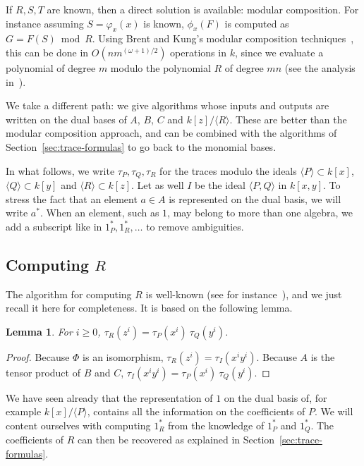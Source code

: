 \documentclass[12pt]{article}
\newcommand{\ang}[1]{\langle#1\rangle}
\newtheorem{Lemma}{Lemma}
\begin{document}
If $R,S,T$ are known, then a direct solution is available: modular
composition. For instance assuming $S=\varphi_x(x)$ is known,
$\phi_x(F)$ is computed as $G=F(S) \bmod R$. Using Brent and Kung's
modular composition techniques~\cite{brent+kung}, this can be done in
$O(n m^{(\omega+1)/2})$ operations in $k$, since we evaluate a
polynomial of degree $m$ modulo the polynomial $R$ of degree $mn$ (see
the analysis in~\cite{shoup94}).

We take a different path: we give algorithms whose inputs and outputs
are written on the dual bases of $A$, $B$, $C$ and
$k[z]/\ang{R}$. These are better than the modular composition
approach, and can be combined with the algorithms of
Section~\ref{sec:trace-formulas} to go back to the monomial bases.

In what follows, we write $\tau_P,\tau_Q,\tau_R$ for the traces modulo
the ideals $\langle P\rangle\subset k[x]$, $\langle Q \rangle \subset
k[y]$ and $\langle R \rangle \subset k[z]$. Let as well $I$ be the
ideal $\langle P, Q\rangle$ in $k[x,y]$. To stress the fact that an
element $a\in A$ is represented on the dual basis, we will write
$a^\ast$. When an element, such as $1$, may belong to more than one
algebra, we add a subscript like in $1_P^\ast, 1_R^\ast, \dots$ to
remove ambiguities.




\subsection{Computing $R$} 

The algorithm for computing $R$ is well-known (see for
instance~\cite{BoFlSaSc06}), and we just recall it here for
completeness. It is based on the following lemma.

\begin{Lemma}
  For $i \ge 0$, $\tau_R(z^i) = \tau_P(x^i) \ \tau_Q(y^i)$.
\end{Lemma}
\begin{proof}
  Because $\Phi$ is an isomorphism, $\tau_R(z^i) = \tau_I(x^i
  y^i)$. Because $A$ is the tensor product of $B$ and
  $C$, $\tau_I(x^iy^i)=\tau_P(x^i) \ \tau_Q(y^i)$.
\end{proof}

We have seen already that the representation of $1$ on the dual basis
of, for example $k[x]/\ang{P}$, contains all the information on the
coefficients of $P$. We will content ourselves with computing
$1_R^\ast$ from the knowledge of $1_P^\ast$ and $1_Q^\ast$. The
coefficients of $R$ can then be recovered as explained in
Section~\ref{sec:trace-formulas}.
\end{document}
